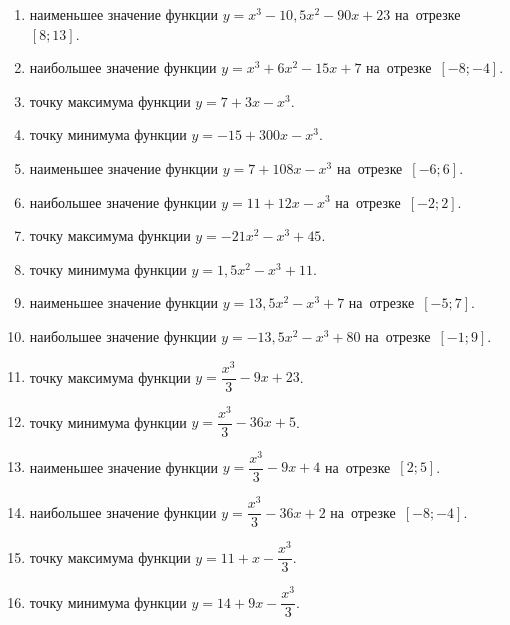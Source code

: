 \documentclass[a4paper,10pt]{article}
\begin{document}
\begin{enumerate}
\item {} наименьшее значение функции $y=x^3 -10,5x^2-90x+23$ на~отрезке~$\left[8;13\right]$.

\item {} наибольшее значение функции $y=x^3 +6x^2-15x+7$ на~отрезке~$\left[-8;-4\right]$.

\item {} точку максимума функции $y=7+3x-x^3$.

\item {} точку минимума функции $y=-15+300x-x^3$.

\item {} наименьшее значение функции $y=7+108x-x^3$ на~отрезке~$\left[-6;6\right]$.

\item {} наибольшее значение функции $y=11+12x-x^3$ на~отрезке~$\left[-2;2\right]$.

\item {} точку максимума функции $y=-21x^2-x^3+45$.

\item {} точку минимума функции $y=1,5x^2-x^3+11$.

\item {} наименьшее значение функции $y=13,5x^2-x^3+7$ на~отрезке~$\left[-5;7\right]$.

\item {} наибольшее значение функции $y=-13,5x^2-x^3+80$ на~отрезке~$\left[-1;9\right]$.

\item {} точку максимума функции $y=\dfrac{x^3}{3} -9x+23$.

\item {} точку минимума функции $y=\dfrac{x^3}{3} -36x+5$.

\item {} наименьшее значение функции $y=\dfrac{x^3}{3} -9x+4$ на~отрезке~$\left[2;5\right]$.

\item {} наибольшее значение функции $y=\dfrac{x^3}{3} -36x+2$ на~отрезке~$\left[-8;-4\right]$.

\item {} точку максимума функции $y=11 +x-\dfrac{x^3}{3}$.

\item {} точку минимума функции $y=14 +9x-\dfrac{x^3}{3}$.


\end{enumerate}
\end{document}
